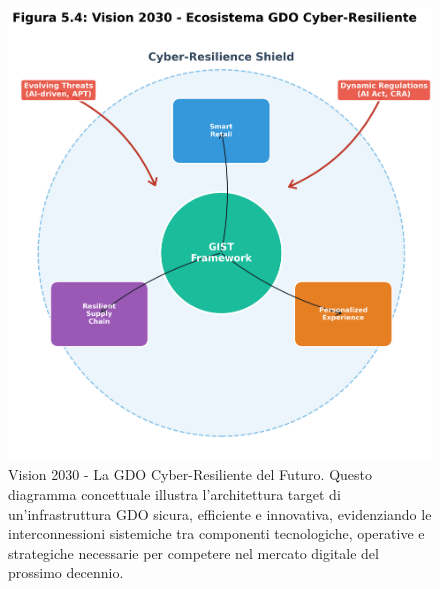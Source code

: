 \begin{figure}[htbp]
\centering
\includegraphics[width=1\textwidth]{thesis_figures/cap5/figura_5_4_vision_2030_matplotlib.png}
\caption{Vision 2030 - La GDO Cyber-Resiliente del Futuro. Questo diagramma concettuale illustra l'architettura target di un'infrastruttura GDO sicura, efficiente e innovativa, evidenziando le interconnessioni sistemiche tra componenti tecnologiche, operative e strategiche necessarie per competere nel mercato digitale del prossimo decennio.}
\label{fig:vision_2030}
\end{figure}



